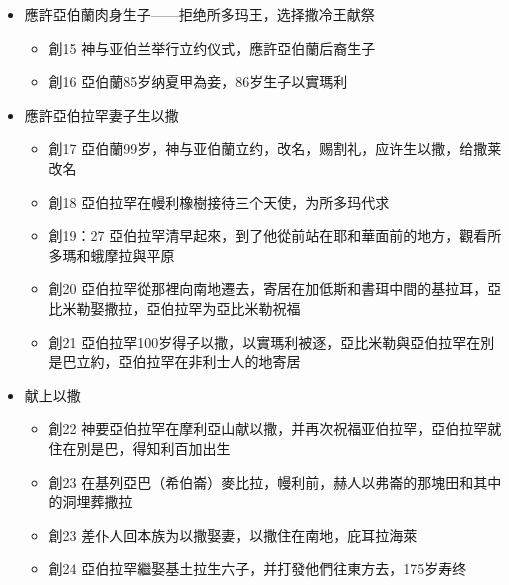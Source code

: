 \begin{itemize}
\begin{itemize}
\item 創14:12 四王把亞伯蘭的侄兒羅得和羅得的財物擄掠去了，當時羅得正住在所多瑪。
\item 創14:15 亞伯蘭率領精練壯直追到但。又追到大馬士革左邊的何把，連他侄兒羅得和他的財物，以及婦女、人民也都奪回來
\item 創14:18 亞伯蘭殺敗回來的時候，所多瑪王出來，在沙微谷(王谷)迎接他,又有撒冷王麥基洗德帶著餅和酒出來迎接，亚伯兰献祭给撒冷王，拒绝所多玛王财物
\end{itemize}
\item 應許亞伯蘭肉身生子——拒绝所多玛王，选择撒冷王献祭
\begin{itemize} 
\itemsep-.35em 
\item 創15 神与亚伯兰举行立约仪式，應許亞伯蘭后裔生子
\item 創16 亞伯蘭85岁纳夏甲為妾，86岁生子以實瑪利
\end{itemize}
\item 應許亞伯拉罕妻子生以撒
\begin{itemize} 
\itemsep-.35em 
\item 創17 亞伯蘭99岁，神与亚伯蘭立约，改名，赐割礼，应许生以撒，给撒莱改名
\item 創18 亞伯拉罕在幔利橡樹接待三个天使，为所多玛代求
\item 創19：27 亞伯拉罕清早起來，到了他從前站在耶和華面前的地方，觀看所多瑪和蛾摩拉與平原
\item 創20 亞伯拉罕從那裡向南地遷去，寄居在加低斯和書珥中間的基拉耳，亞比米勒娶撒拉，亞伯拉罕为亞比米勒祝福
\item 創21 亞伯拉罕100岁得子以撒，以實瑪利被逐，亞比米勒與亞伯拉罕在別是巴立約，亞伯拉罕在非利士人的地寄居
\end{itemize}
\item 献上以撒
\begin{itemize} 
\itemsep-.35em 
\item 創22 神要亞伯拉罕在摩利亞山献以撒，并再次祝福亚伯拉罕，亞伯拉罕就住在別是巴，得知利百加出生
\item 創23 在基列亞巴（希伯崙）麥比拉，幔利前，赫人以弗崙的那塊田和其中的洞埋葬撒拉
\item 創23 差仆人回本族为以撒娶妻，以撒住在南地，庇耳拉海萊
\item 創24 亞伯拉罕繼娶基土拉生六子，并打發他們往東方去，175岁寿终 
\end{itemize}
\end{itemize}


